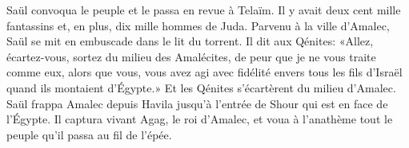 Saül convoqua le peuple et le passa en revue à Telaïm.
	Il y avait deux cent mille fantassins et, en plus, dix mille hommes de Juda.
Parvenu à la ville d’Amalec, Saül se mit en embuscade dans le lit du torrent.
Il dit aux Qénites: «Allez, écartez-vous,
	sortez du milieu des Amalécites, de peur que je ne vous traite comme eux,
	alors que vous, vous avez agi avec fidélité envers tous les fils d’Israël
		quand ils montaient d’Égypte.»
Et les Qénites s’écartèrent du milieu d’Amalec.
Saül frappa Amalec depuis Havila jusqu’à l’entrée de Shour qui est en face de l’Égypte.
Il captura vivant Agag, le roi d’Amalec,
	et voua à l’anathème tout le peuple qu’il passa au fil de l’épée.
